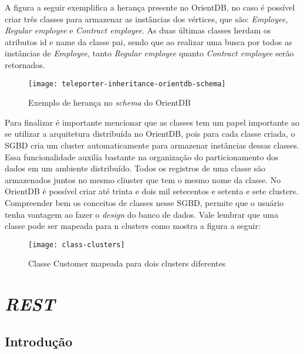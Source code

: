 	A figura a seguir exemplifica a herança presente no OrientDB, no caso é possível criar três classes para armazenar as instâncias dos vértices, que são: \textit{Employee}, \textit{Regular employee} e \textit{Contract employee}. As duas últimas classes herdam os atributos id e name da classe pai, sendo que ao realizar uma busca por todos as instâncias de \textit{Employee}, tanto \textit{Regular employee} quanto \textit{Contract employee} serão retornados.
	
\begin{figure}[h]
	\centering
    \texttt{[image: teleporter-inheritance-orientdb-schema]}
    \caption{Exemplo de herança no \textit{schema} do OrientDB }
    \label{fig:inheritance-orient}
\end{figure}
	
	Para finalizar é importante mencionar que as classes tem um papel importante ao se utilizar a arquitetura distribuída no OrientDB, pois para cada classe criada, o SGBD cria um cluster automaticamente para armazenar instâncias dessas classes. Essa funcionalidade auxilía bastante na organização do particionamento dos dados em um ambiente distribuído. Todos os registros de uma classe são armazenados juntos no mesmo cliuster que tem o mesmo nome da classe. No OrientDB é possível criar até trinta e dois mil setecentos e setenta e sete clusters. Compreender bem os conceitos de classes nesse SGBD, permite que o usuário tenha vantagem ao fazer o \textit{design} do banco de dados. Vale lembrar que uma classe pode ser mapeada para n clusters como mostra a figura a seguir:
\begin{figure}[h]
	\centering
    \texttt{[image: class-clusters]}
    \caption{Classe Customer mapeada para dois clusters diferentes}
    \label{fig:class-cluster}
\end{figure}

\section{\textit{REST}}

\subsection{Introdução} \label{rest_intro}

